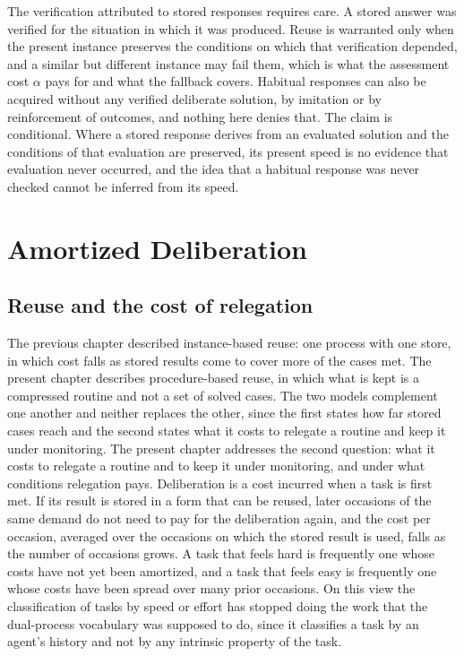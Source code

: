 \documentclass[11pt]{report}
\theoremstyle{remark}
\theoremstyle{definition}
\begin{document}
The verification attributed to stored responses requires care. A stored answer was verified for the situation in which it was produced. Reuse is warranted only when the present instance preserves the conditions on which that verification depended, and a similar but different instance may fail them, which is what the assessment cost $\alpha$ pays for and what the fallback covers. Habitual responses can also be acquired without any verified deliberate solution, by imitation or by reinforcement of outcomes, and nothing here denies that. The claim is conditional. Where a stored response derives from an evaluated solution and the conditions of that evaluation are preserved, its present speed is no evidence that evaluation never occurred, and the idea that a habitual response was never checked cannot be inferred from its speed.

\chapter{Amortized Deliberation}\label{ch:amort}

\section{Reuse and the cost of relegation}

The previous chapter described instance-based reuse: one process with one store, in which cost falls as stored results come to cover more of the cases met. The present chapter describes procedure-based reuse, in which what is kept is a compressed routine and not a set of solved cases. The two models complement one another and neither replaces the other, since the first states how far stored cases reach and the second states what it costs to relegate a routine and keep it under monitoring. The present chapter addresses the second question: what it costs to relegate a routine and to keep it under monitoring, and under what conditions relegation pays. Deliberation is a cost incurred when a task is first met. If its result is stored in a form that can be reused, later occasions of the same demand do not need to pay for the deliberation again, and the cost per occasion, averaged over the occasions on which the stored result is used, falls as the number of occasions grows. A task that feels hard is frequently one whose costs have not yet been amortized, and a task that feels easy is frequently one whose costs have been spread over many prior occasions. On this view the classification of tasks by speed or effort has stopped doing the work that the dual-process vocabulary was supposed to do, since it classifies a task by an agent's history and not by any intrinsic property of the task.
\end{document}

